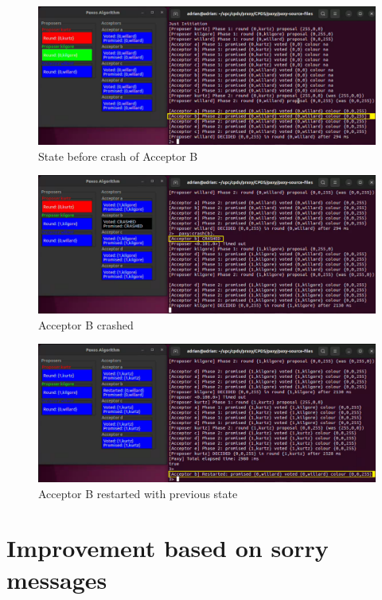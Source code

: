 \documentclass[a4paper, 10pt]{article}
\begin{document}
\begin{figure}[H]
  \centering
  \includegraphics[width=\linewidth]{images/Tolerance1.png}
    \caption{State before crash of Acceptor B}
    \label{pre-crash}
\end{figure} 


\begin{figure}[H]
  \centering
  \includegraphics[width=\linewidth]{images/Tolerance2.png}
    \caption{Acceptor B crashed}
    \label{crash}
\end{figure} 

\begin{figure}[H]
  \centering
  \includegraphics[width=\linewidth]{images/Tolerance3.png}
    \caption{Acceptor B restarted with previous state}
    \label{restart}
\end{figure}


\clearpage
\section{Improvement based on sorry messages}
\label{sec:improvement}
\end{document}
